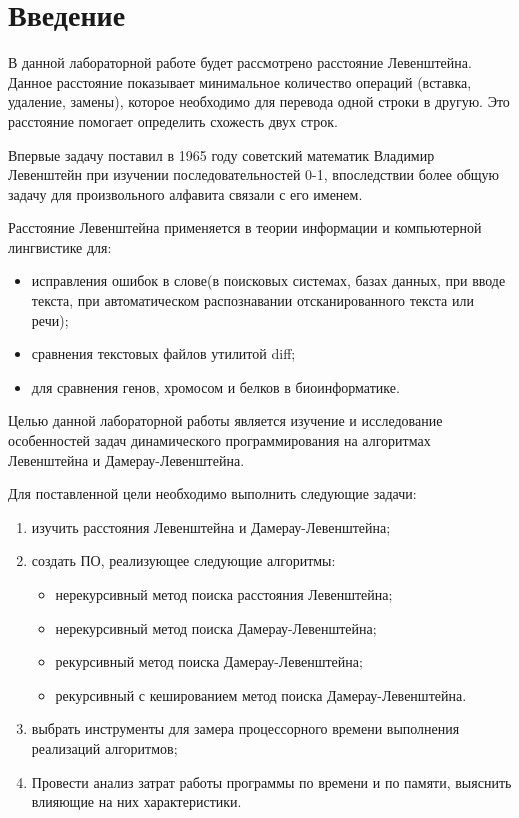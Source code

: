 \chapter*{Введение}

В данной лабораторной работе будет рассмотрено расстояние Левенштейна. Данное расстояние показывает минимальное количество операций (вставка, удаление, замены), которое необходимо для перевода одной строки в другую. Это расстояние помогает определить схожесть двух строк.

Впервые задачу поставил в 1965 году советский математик Владимир Левенштейн при изучении последовательностей 0-1, впоследствии более общую задачу для произвольного алфавита связали с его именем.

Расстояние Левенштейна применяется в теории информации и компьютерной лингвистике для:
\begin{itemize}
	\item исправления ошибок в слове(в поисковых системах, базах данных, при вводе текста, при автоматическом распознавании отсканированного текста или речи);
	\item сравнения текстовых файлов утилитой diff;
	\item для сравнения генов, хромосом и белков в биоинформатике.
\end{itemize}

Целью данной лабораторной работы является изучение и исследование особенностей задач динамического программирования на алгоритмах Левенштейна и Дамерау-Левенштейна.

Для поставленной цели необходимо выполнить следующие задачи:
\begin{enumerate}[label={\arabic*)}]
	\item изучить расстояния Левенштейна и Дамерау-Левенштейна;
	\item создать ПО, реализующее следующие алгоритмы:
	\begin{itemize}
		\item нерекурсивный метод поиска расстояния Левенштейна;
		\item нерекурсивный метод поиска Дамерау-Левенштейна;
		\item рекурсивный метод поиска Дамерау-Левенштейна;
		\item  рекурсивный с кешированием метод поиска Дамерау-Левенштейна.
	\end{itemize}
	\item выбрать инструменты для замера процессорного времени выполнения реализаций алгоритмов;
	\item Провести анализ затрат работы программы по времени и по памяти, выяснить влияющие на них характеристики.
\end{enumerate}